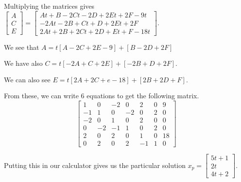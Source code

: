 \documentclass[../diffeq.tex]{subfiles}
\begin{document}
\begin{example}
    Multiplying the matrices gives $\begin{bmatrix}
        A\\C\\E
    \end{bmatrix}=\begin{bmatrix}
        At+B-2Ct-2D+2Et+2F-9t\\
        -2At-2B+Ct+D+2Et+2F\\
        2At+2B+2Ct+2D+Et+F-18t
    \end{bmatrix}$.

    We see that $A=t[A-2C+2E-9]+[B-2D+2F]$

    We have also $C=t[-2A+C+2E]+[-2B+D+2F]$.

    We can also see $E=t[2A+2C+e-18]+[2B+2D+F]$.

    From these, we can write 6 equations to get the following matrix.
    \[ \begin{bmatrix}
        1 & 0 & -2 & 0 & 2 & 0 & 9 \\
        -1 & 1 & 0 & -2 & 0 & 2 & 0 \\
        -2 & 0 & 1 & 0 & 2 & 0 & 0\\
        0 & -2 & -1 & 1 & 0 & 2 & 0\\
        2 & 0 & 2 & 0 & 1 & 0 & 18\\
        0 & 2 & 0 & 2 & -1 & 1 & 0
    \end{bmatrix} \]

    Putting this in our calculator gives us the particular solution $x_p=\begin{bmatrix}
        5t+1\\ 2t \\ 4t+2
    \end{bmatrix}$.
\end{example}
\end{document}
